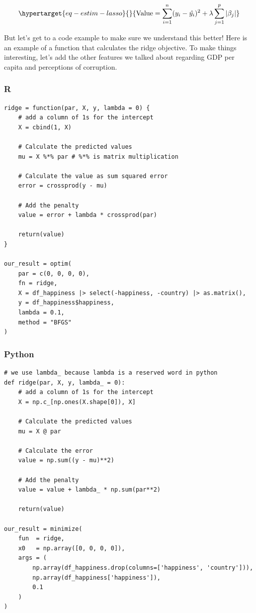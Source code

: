 \documentclass[
  letterpaper,
]{krantz}
\begin{document}
\begin{equation}\protect\hypertarget{eq-estim-lasso}{}{
\textrm{Value} = \sum_{i=1}^{n} (y_i - \hat{y_i})^2 + \lambda \sum_{j=1}^{p} |\beta_j|
}\label{eq-estim-lasso}\end{equation}

But let's get to a code example to make sure we understand this better!
Here is an example of a function that calculates the ridge objective. To
make things interesting, let's add the other features we talked about
regarding GDP per capita and perceptions of corruption.

\subsubsection{R}

\begin{verbatim}
ridge = function(par, X, y, lambda = 0) {
    # add a column of 1s for the intercept
    X = cbind(1, X)

    # Calculate the predicted values
    mu = X %*% par # %*% is matrix multiplication

    # Calculate the value as sum squared error
    error = crossprod(y - mu)

    # Add the penalty
    value = error + lambda * crossprod(par)

    return(value)
}

our_result = optim(
    par = c(0, 0, 0, 0),
    fn = ridge,
    X = df_happiness |> select(-happiness, -country) |> as.matrix(),
    y = df_happiness$happiness,
    lambda = 0.1,
    method = "BFGS"
)
\end{verbatim}

\subsubsection{Python}

\begin{verbatim}
# we use lambda_ because lambda is a reserved word in python
def ridge(par, X, y, lambda_ = 0):
    # add a column of 1s for the intercept
    X = np.c_[np.ones(X.shape[0]), X]

    # Calculate the predicted values
    mu = X @ par
    
    # Calculate the error
    value = np.sum((y - mu)**2)
    
    # Add the penalty
    value = value + lambda_ * np.sum(par**2)
    
    return(value)

our_result = minimize(
    fun  = ridge,
    x0   = np.array([0, 0, 0, 0]),
    args = (
        np.array(df_happiness.drop(columns=['happiness', 'country'])),
        np.array(df_happiness['happiness']), 
        0.1
    )
)
\end{verbatim}
\end{document}
